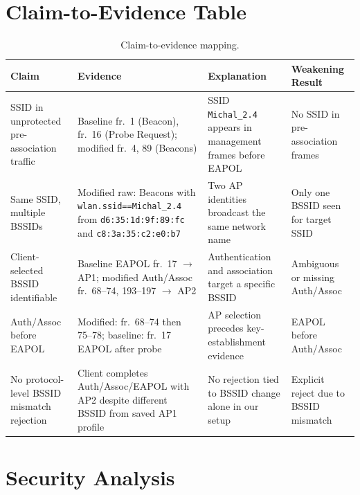 \documentclass[12pt,a4paper]{article}
\begin{document}
\section{Claim-to-Evidence Table}

\begin{table}[H]
\centering
\scriptsize
\renewcommand{\arraystretch}{1.35}
\begin{tabularx}{\textwidth}{|p{3.2cm}|X|X|X|}
\hline
\textbf{Claim} & \textbf{Evidence} & \textbf{Explanation} & \textbf{Weakening Result} \\
\hline

SSID in unprotected pre-association traffic &
Baseline fr.\ 1 (Beacon), fr.\ 16 (Probe Request); modified fr.\ 4, 89 (Beacons) &
SSID \texttt{Michal\_2.4} appears in management frames before EAPOL &
No SSID in pre-association frames \\
\hline

Same SSID, multiple BSSIDs &
Modified raw: Beacons with \texttt{wlan.ssid==Michal\_2.4} from \texttt{d6:35:1d:9f:89:fc} and \texttt{c8:3a:35:c2:e0:b7} &
Two AP identities broadcast the same network name &
Only one BSSID seen for target SSID \\
\hline

Client-selected BSSID identifiable &
Baseline EAPOL fr.\ 17 $\rightarrow$ AP1; modified Auth/Assoc fr.\ 68--74, 193--197 $\rightarrow$ AP2 &
Authentication and association target a specific BSSID &
Ambiguous or missing Auth/Assoc \\
\hline

Auth/Assoc before EAPOL &
Modified: fr.\ 68--74 then 75--78; baseline: fr.\ 17 EAPOL after probe &
AP selection precedes key-establishment evidence &
EAPOL before Auth/Assoc \\
\hline

No protocol-level BSSID mismatch rejection &
Client completes Auth/Assoc/EAPOL with AP2 despite different BSSID from saved AP1 profile &
No rejection tied to BSSID change alone in our setup &
Explicit reject due to BSSID mismatch \\
\hline
\end{tabularx}
\caption{Claim-to-evidence mapping.}
\end{table}

\section{Security Analysis}
\end{document}
